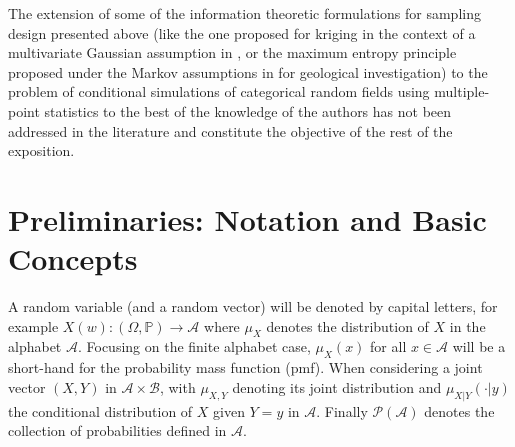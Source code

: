 {The extension of some of the information theoretic formulations for sampling design presented above (like the one proposed for kriging in the context of a multivariate Gaussian assumption in \citep{abellan_2010a},  %
or the maximum entropy principle proposed under the Markov assumptions in \citep{xu_2017a} for geological investigation)  
to the problem of conditional simulations of categorical random fields using multiple-point statistics to the best of the knowledge of the authors has not been addressed in the literature and constitute the objective of the rest of the exposition.}


\section{Preliminaries: Notation and Basic Concepts}
\label{sec_pre_PI}

{
A random variable (and a random vector) will be denoted by capital letters, for example $X(w):(\Omega, \mathbb{P}) \longrightarrow \mathcal{A}$ where $\mu_X$ denotes the distribution of $X$ in the alphabet $\mathcal{A}$. Focusing on the finite alphabet case, $\mu_X(x)$ for all $x\in \mathcal{A}$ will be a short-hand for the probability mass function (pmf).
When considering a joint vector $(X,Y)$ in $\mathcal{A}\times \mathcal{B}$, with $\mu_{X,Y}$ denoting its joint distribution and 
$\mu_{X|Y}(\cdot|y)$ the conditional distribution of $X$ given $Y=y$ in $\mathcal{A}$. Finally $\mathcal{P}(\mathcal{A})$ denotes 
the collection of probabilities defined in $\mathcal{A}$.
}

